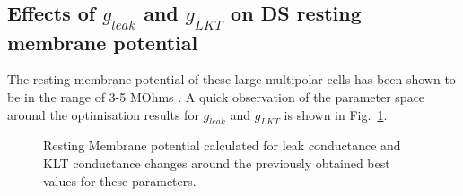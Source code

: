 

\subsection{Effects of $g_{leak}$ and $g_{LKT}$ on DS resting membrane potential}

The resting membrane potential of these large multipolar cells has been shown to be in the range of 3-5 MOhms . A quick observation of the parameter space around the optimisation results for $g_{leak}$ and $g_{LKT}$ is shown in Fig.~\ref{fig:leakVltk}.  
 \begin{figure}[h!]
   \centering
   \caption{Resting Membrane potential calculated for leak conductance and KLT conductance changes around the previously obtained best values for these parameters.}\label{fig:leakVltk}
 \end{figure}


